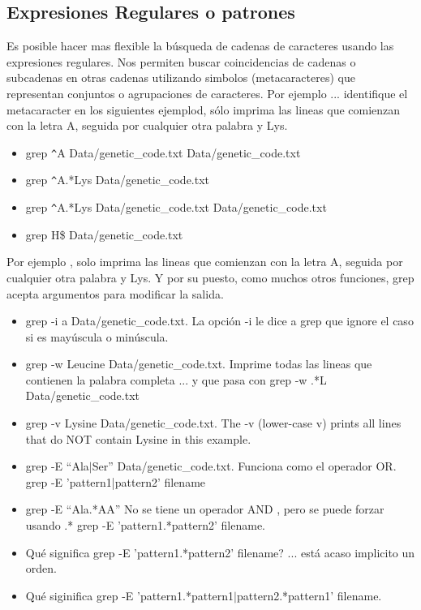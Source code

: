 \documentclass[10pt]{article}
\begin{document}
\subsection{Expresiones Regulares o patrones}
Es posible hacer mas flexible la búsqueda de cadenas de caracteres usando las expresiones regulares. Nos permiten buscar coincidencias de cadenas o subcadenas en otras cadenas utilizando simbolos (metacaracteres) que representan conjuntos o agrupaciones de caracteres. Por ejemplo ... identifique el metacaracter en los siguientes ejemplod, sólo imprima las lineas que comienzan con la letra A, seguida por cualquier otra palabra y Lys.
\begin{itemize}
\item grep  \verb"^"A   Data/genetic\_code.txt Data/genetic\_code.txt
\item grep  \verb"^"A.*Lys   Data/genetic\_code.txt
\item grep \verb"^"A.*Lys   Data/genetic\_code.txt Data/genetic\_code.txt
\item grep H\$ Data/genetic\_code.txt
\end{itemize}
Por ejemplo , solo imprima las lineas que comienzan con la letra A, seguida por cualquier otra palabra y Lys. Y por su puesto, como muchos otros funciones, grep acepta argumentos para modificar la salida.
\begin{itemize}

\item grep -i a Data/genetic\_code.txt. La opción -i le dice a grep que ignore el caso si es mayúscula o minúscula.
\item grep -w Leucine Data/genetic\_code.txt. Imprime todas las lineas que contienen la palabra completa ... y que pasa con grep -w .*L Data/genetic\_code.txt
\item grep -v Lysine Data/genetic\_code.txt. The -v (lower-case v) prints all lines that do NOT contain Lysine in this example.
\item grep -E ``Ala$|$Ser'' Data/genetic\_code.txt. Funciona como el operador OR. grep -E 'pattern1|pattern2' filename
\item grep -E ``Ala.*AA''  No se tiene un operador AND , pero se puede forzar usando .*  grep -E 'pattern1.*pattern2' filename.
\item Qué significa grep -E 'pattern1.*pattern2' filename? ... está acaso  implicito un orden.
\item Qué siginifica grep -E 'pattern1.*pattern1$|$pattern2.*pattern1' filename.


\end{itemize}
\end{document}
